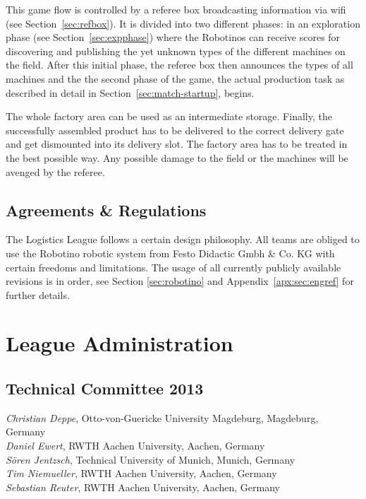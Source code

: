 \documentclass[12pt,twoside]{article}
\newcommand{\refsec}[1]{Section~\ref{#1}}
\begin{document}
This game flow is controlled by a referee box broadcasting information
via wifi (see \refsec{sec:refbox}). It is divided into two different
phases: in an exploration phase (see \refsec{sec:expphase}) where the
Robotinos can receive scores for discovering and publishing the yet
unknown types of the different machines on the field. After this
initial phase, the referee box then announces the types of all
machines and the the second phase of the game, the actual production
task as described in detail in \refsec{sec:match-startup}, begins.

The whole factory area can be used as an intermediate
storage. Finally, the successfully assembled product has to be
delivered to the correct delivery gate and get dismounted into its
delivery slot. The factory area has to be treated in the best possible
way. Any possible damage to the field or the machines will be avenged
by the referee.

\subsection{Agreements \& Regulations} \label{sec:agreements}

The Logistics League follows a certain design philosophy. All teams
are obliged to use the Robotino robotic system from Festo Didactic
Gmbh \& Co. KG with certain freedoms and limitations. The usage of all
currently publicly available revisions is in order, see Section
\ref{sec:robotino} and Appendix~\ref{apx:sec:engref} for further
details.




\section{League Administration} \label{sec:commitees}
\subsection{Technical Committee 2013} \label{sec:tc}
\emph{Christian Deppe}, Otto-von-Guericke University Magdeburg, Magdeburg,
Germany\\
\emph{Daniel Ewert}, RWTH Aachen University, Aachen, Germany\\
\emph{S\"oren Jentzsch}, Technical University of Munich, Munich, Germany\\
\emph{Tim Niemueller}, RWTH Aachen University, Aachen, Germany\\
\emph{Sebastian Reuter}, RWTH Aachen University, Aachen, Germany
\end{document}
